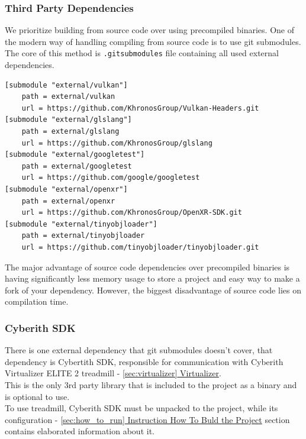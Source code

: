 \subsubsection{Third Party Dependencies}
\label{sec:3rdparty}
\hspace{\parindent} We prioritize building from source code over using precompiled binaries.
One of the modern way of handling compiling from source code is to use git submodules. The core of this method is \texttt{.gitsubmodules} file containing all used external dependencies.
\begin{lstlisting}[caption=.gitsubmodules]
[submodule "external/vulkan"]
	path = external/vulkan
	url = https://github.com/KhronosGroup/Vulkan-Headers.git
[submodule "external/glslang"]
	path = external/glslang
	url = https://github.com/KhronosGroup/glslang
[submodule "external/googletest"]
	path = external/googletest
	url = https://github.com/google/googletest
[submodule "external/openxr"]
	path = external/openxr
	url = https://github.com/KhronosGroup/OpenXR-SDK.git
[submodule "external/tinyobjloader"]
	path = external/tinyobjloader
	url = https://github.com/tinyobjloader/tinyobjloader.git
\end{lstlisting}
The major advantage of source code dependencies over precompiled binaries is having significantly less memory usage to store a project and easy way to make a fork of your dependency. However, the biggest disadvantage of source code lies on compilation time.

\subsubsection{Cyberith SDK}
\label{sec:build_cybsdk}
\hspace{\parindent} There is one external dependency that git submodules doesn't cover, that dependency is Cybertith SDK, responsible for communication with Cyberith Virtualizer ELITE 2 treadmill - \hyperref[sec:virtualizer]{\ref*{sec:virtualizer} Virtualizer}.\\
This is the only 3rd party library that is included to the project as a binary and is optional to use.\\
To use treadmill, Cyberith SDK must be unpacked to the project, while its configuration - \hyperref[sec:how_to_run]{\ref*{sec:how_to_run} Instruction How To Buld the Project} section contains elaborated information about it.  

